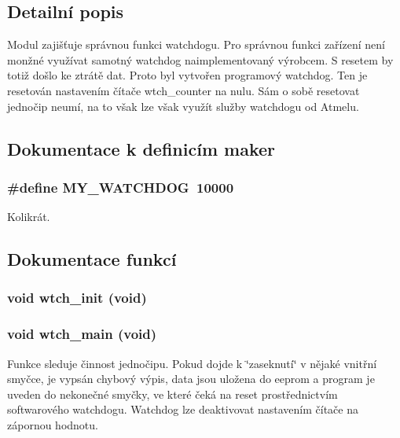 \subsection{Detailní popis}
Modul zajišťuje správnou funkci watchdogu. Pro správnou funkci zařízení není monžné využívat samotný watchdog naimplementovaný výrobcem. S resetem by totiž došlo ke ztrátě dat. Proto byl vytvořen programový watchdog. Ten je resetován nastavením čítače wtch\_\-counter na nulu. Sám o sobě resetovat jednočip neumí, na to však lze však využít služby watchdogu od Atmelu. 

\subsection{Dokumentace k definicím maker}
\subsubsection[{MY\_\-WATCHDOG}]{\setlength{\rightskip}{0pt plus 5cm}\#define MY\_\-WATCHDOG~10000}\label{watchdog_8c_a1ec06ff01e8ca7e4f7c2a673ba1ac499}


Kolikrát. 

\subsection{Dokumentace funkcí}
\subsubsection[{wtch\_\-init}]{\setlength{\rightskip}{0pt plus 5cm}void wtch\_\-init (void)}\label{watchdog_8c_acbdab9cad3f2f8b16ff00ad69af20145}
\subsubsection[{wtch\_\-main}]{\setlength{\rightskip}{0pt plus 5cm}void wtch\_\-main (void)}\label{watchdog_8c_ab51323d0a8ec8c832d7be1ab44ffbc3b}
Funkce sleduje činnost jednočipu. Pokud dojde k \char`\"{}zaseknutí\char`\"{} v nějaké vnitřní smyčce, je vypsán chybový výpis, data jsou uložena do eeprom a program je uveden do nekonečné smyčky, ve které čeká na reset prostřednictvím softwarového watchdogu. Watchdog lze deaktivovat nastavením čítače na zápornou hodnotu. 

